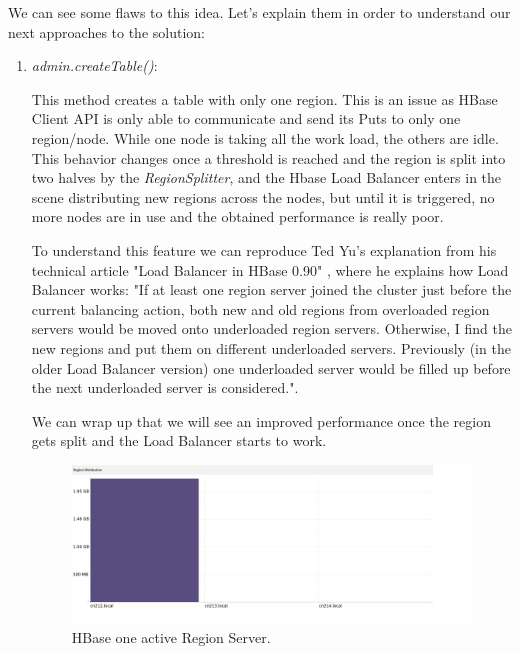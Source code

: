 \bigskip


\par

We can see some flaws to this idea. Let's explain them in order to understand our next approaches to the solution:

\begin{enumerate}
\item \textit{admin.createTable()}:
\par
This method creates a table with only one region. This is an issue as HBase Client API is only able to communicate and send its Puts to only one region/node. While one node is taking all the work load, the others are idle. This behavior changes once a threshold is reached and the region is split into two halves by the \textit{RegionSplitter}, and the Hbase Load Balancer enters in the scene distributing new regions across the nodes, but until it is triggered, no more nodes are in use and the obtained performance is really poor.
\par

To understand this feature we can reproduce Ted Yu's explanation from his technical article "Load Balancer in HBase 0.90" \cite{LoadBalancer}, where he explains how Load Balancer works: "If at least one region server joined the cluster just before the current balancing action, both new and old regions from overloaded region servers would be moved onto underloaded region servers. Otherwise, I find the new regions and put them on different underloaded servers. Previously (in the older Load Balancer version) one underloaded server would be filled up before the next underloaded server is considered.".
\par
We can wrap up that we will see an improved performance once the region gets split and the Load Balancer starts to work.



\bigskip
\begin{figure}[htb]
\centering
\includegraphics[width=1.2\textwidth,height=0.41\textheight]{./images/1regionserveractive1.png}
\caption{HBase one active Region Server.} \label{fig:1regionserveractive}
\end{figure}



\end{enumerate}
